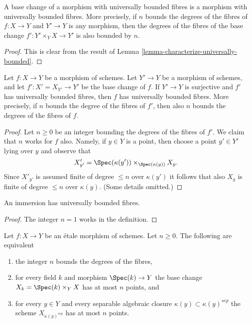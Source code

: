 \begin{lemma}
\label{lemma-base-change-universally-bounded}
A base change of a morphism with universally bounded fibres is
a morphism with universally bounded fibres. More precisely, if
$n$ bounds the degrees of the fibres of $f : X \to Y$ and $Y' \to Y$
is any morphism, then the degrees of the fibres of the base change
$f' : Y' \times_Y X \to Y'$ is also bounded by $n$.
\end{lemma}

\begin{proof}
This is clear from the result of
Lemma \ref{lemma-characterize-universally-bounded}.
\end{proof}

\begin{lemma}
\label{lemma-descent-universally-bounded}
Let $f : X \to Y$ be a morphism of schemes.
Let $Y' \to Y$ be a morphism of schemes, and let
$f' : X' = X_{Y'} \to Y'$ be the base change of $f$.
If $Y' \to Y$ is surjective and $f'$ has universally bounded fibres,
then $f$ has universally bounded fibres. More precisely, if $n$ bounds
the degree of the fibres of $f'$, then also $n$ bounds the degrees
of the fibres of $f$.
\end{lemma}

\begin{proof}
Let $n \geq 0$ be an integer bounding the degrees of the fibres of $f'$.
We claim that $n$ works for $f$ also. Namely, if $y \in Y$ is a point,
then choose a point $y' \in Y'$ lying over $y$ and observe that
$$
X'_{y'} = \Spec(\kappa(y')) \times_{\Spec(\kappa(y))} X_y.
$$
Since $X'_{y'}$ is assumed finite of degree $\leq n$ over $\kappa(y')$
it follows that also $X_y$ is finite of degree $\leq n$ over $\kappa(y)$.
(Some details omitted.)
\end{proof}

\begin{lemma}
\label{lemma-immersion-universally-bounded}
An immersion has universally bounded fibres.
\end{lemma}

\begin{proof}
The integer $n = 1$ works in the definition.
\end{proof}

\begin{lemma}
\label{lemma-etale-universally-bounded}
Let $f : X \to Y$ be an \'etale morphism of schemes.
Let $n \geq 0$. The following are equivalent
\begin{enumerate}
\item the integer $n$ bounds the degrees of the fibres,
\item for every field $k$ and morphism $\Spec(k) \to Y$ the
base change $X_k = \Spec(k) \times_Y X$ has at most $n$ points, and
\item for every $y \in Y$ and every separable algebraic closure
$\kappa(y) \subset \kappa(y)^{sep}$ the scheme
$X_{\kappa(y)^{sep}}$ has at most $n$ points.
\end{enumerate}
\end{lemma}

